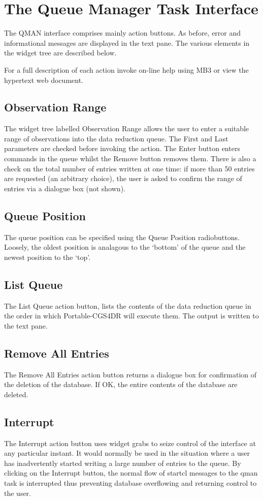 \documentclass[a4paper]{book}
\renewcommand{\_}{{\tt\char'137}}
\begin{document}
\section{The Queue Manager Task Interface}
The QMAN interface comprises mainly action buttons.
As before, error and informational messages are displayed in the text pane.
The various elements in the widget tree are described below.

For a full description of each action invoke on-line help using MB3 or view the hypertext web document.

\subsection{Observation Range}
The widget tree labelled {\sf Observation Range} allows the user to enter a
suitable range of observations into the data reduction queue. The {\sf First}
and {\sf Last} parameters are checked before invoking the action. The {\sf Enter}
button enters commands in the queue whilst the {\sf Remove} button removes them.
There is also a check on the total number of entries written at one time: if
more than 50 entries are requested (an arbitrary choice), the user is asked to
confirm the range of entries via a dialogue box (not shown).

\subsection{Queue Position}
The queue position can be specified using the {\sf Queue Position} radiobuttons.
Loosely, the oldest position is analagous to the `bottom' of the queue and the
newest position to the `top'. 

\subsection{List Queue}
The {\sf List Queue} action button, lists the contents of the data reduction
queue in the order in which Portable-CGS4DR will execute them. The output is written to the text pane.

\subsection{Remove All Entries}
The {\sf Remove All Entries} action button returns a dialogue box 
for confirmation of the deletion of the database. If {\sf OK}, the entire contents of the database
are deleted.

\subsection{Interrupt}
The {\sf Interrupt} action button uses widget grabs to seize control of the interface at
any particular instant. It would normally be used in the situation where a user
has inadvertently started writing a large number of entries to the queue. By clicking
on the {\sf Interrupt} button, the normal flow of {\sc startcl} messages to the
qman task is interrupted thus preventing database overflowing and returning control to
the user.
\end{document}
